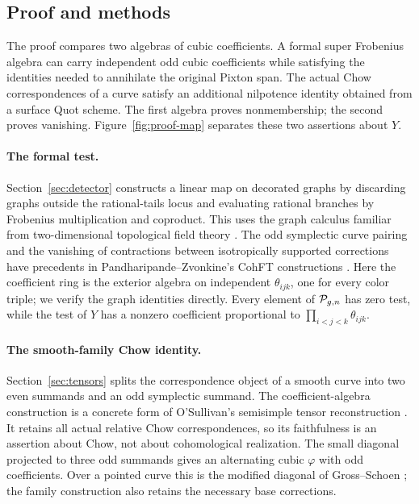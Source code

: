 \subsection{Proof and methods}

The proof compares two algebras of cubic coefficients. A formal
super Frobenius algebra can carry independent odd cubic coefficients
while satisfying the identities needed to annihilate the original
Pixton span. The actual Chow correspondences of a curve satisfy an
additional nilpotence identity obtained from a surface Quot scheme.
The first algebra proves nonmembership; the second proves vanishing.
Figure~\ref{fig:proof-map} separates these two assertions about \(Y\).

\paragraph{The formal test.}
Section~\ref{sec:detector} constructs a linear map on decorated graphs
by discarding graphs outside the rational-tails locus and evaluating
rational branches by Frobenius multiplication and coproduct. This uses
the graph calculus familiar from two-dimensional topological field
theory \cite[Section~2 and Theorem~3]{Abrams1996}.
The odd symplectic curve pairing and the vanishing of contractions
between isotropically supported corrections have precedents in
Pandharipande--Zvonkine's CohFT constructions
\cite[Sections~1.1--1.5 and Remark~11]{PZ2019}.
Here the coefficient ring is the exterior algebra on independent
\(\theta_{ijk}\), one for every color triple; we verify the graph
identities directly. Every element of \(\mathcal P_{g,n}\) has zero test,
while the test of \(Y\) has a nonzero coefficient proportional to
\(\prod_{i<j<k}\theta_{ijk}\).

\paragraph{The smooth-family Chow identity.}
Section~\ref{sec:tensors} splits the correspondence object of a smooth
curve into two even summands and an odd symplectic summand. The
coefficient-algebra construction is a concrete form of O'Sullivan's
semisimple tensor reconstruction
\cite[Lemma~2.3.1]{OSullivan2011}. It retains all actual relative Chow
correspondences, so its faithfulness is an assertion about Chow, not
about cohomological realization. The small diagonal projected to three
odd summands gives an alternating cubic \(\varphi\) with odd
coefficients. Over a pointed curve this is the modified diagonal of
Gross--Schoen \cite[Equation~(0.1) and Sections~2--3]{GrossSchoen1995};
the family construction also retains the necessary base corrections.

